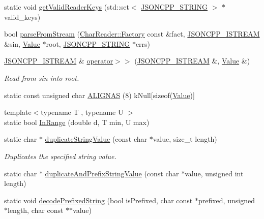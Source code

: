 \begin{DoxyCompactItemize}
\item 
static void \hyperlink{namespaceJson_a8c38450840f3d88e9b981ae132f7ad0a}{get\+Valid\+Reader\+Keys} (std\+::set$<$ \hyperlink{json_8hpp_a1e723f95759de062585bc4a8fd3fa4be}{J\+S\+O\+N\+C\+P\+P\+\_\+\+S\+T\+R\+I\+NG} $>$ $\ast$valid\+\_\+keys)
\item 
bool \hyperlink{namespaceJson_a38f903cfdb57a6c4e86a7dcc42f3712c}{parse\+From\+Stream} (\hyperlink{classJson_1_1CharReader_1_1Factory}{Char\+Reader\+::\+Factory} const \&fact, \hyperlink{json_8hpp_a15f2f70b2ce0a2abd0f8112393dbc4de}{J\+S\+O\+N\+C\+P\+P\+\_\+\+I\+S\+T\+R\+E\+AM} \&sin, \hyperlink{classJson_1_1Value}{Value} $\ast$root, \hyperlink{json_8hpp_a1e723f95759de062585bc4a8fd3fa4be}{J\+S\+O\+N\+C\+P\+P\+\_\+\+S\+T\+R\+I\+NG} $\ast$errs)
\item 
\hyperlink{json_8hpp_a15f2f70b2ce0a2abd0f8112393dbc4de}{J\+S\+O\+N\+C\+P\+P\+\_\+\+I\+S\+T\+R\+E\+AM} \& \hyperlink{namespaceJson_a01f08004efa8a401e01ebd17be77dc71}{operator$>$$>$} (\hyperlink{json_8hpp_a15f2f70b2ce0a2abd0f8112393dbc4de}{J\+S\+O\+N\+C\+P\+P\+\_\+\+I\+S\+T\+R\+E\+AM} \&, \hyperlink{classJson_1_1Value}{Value} \&)
\begin{DoxyCompactList}\small\item\em Read from \textquotesingle{}sin\textquotesingle{} into \textquotesingle{}root\textquotesingle{}. \end{DoxyCompactList}\item 
static const unsigned char \hyperlink{namespaceJson_ad0638ab262fec34f995ca3d8a22c9cc4}{A\+L\+I\+G\+N\+AS} (8) k\+Null\mbox{[}sizeof(\hyperlink{classJson_1_1Value}{Value})\mbox{]}
\item 
{\footnotesize template$<$typename T , typename U $>$ }\\static bool \hyperlink{namespaceJson_aff0180507262a244de61b961178d7443}{In\+Range} (double d, T min, U max)
\item 
static char $\ast$ \hyperlink{namespaceJson_a678ac3a60cd70ec0fb4c9abfd40eb0c4}{duplicate\+String\+Value} (const char $\ast$value, size\+\_\+t length)
\begin{DoxyCompactList}\small\item\em Duplicates the specified string value. \end{DoxyCompactList}\item 
static char $\ast$ \hyperlink{namespaceJson_a9795a09a0141d1f12d307c4386aeaee6}{duplicate\+And\+Prefix\+String\+Value} (const char $\ast$value, unsigned int length)
\item 
static void \hyperlink{namespaceJson_aad8b4982c1acd164f541fba396ac9fb1}{decode\+Prefixed\+String} (bool is\+Prefixed, char const $\ast$prefixed, unsigned $\ast$length, char const $\ast$$\ast$value)
$$
\end{DoxyCompactItemize}
